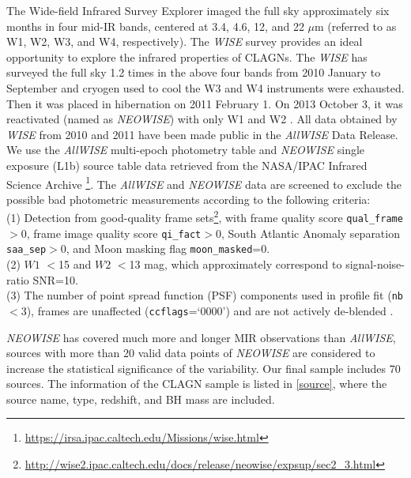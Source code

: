 \documentclass[linenumbers]{aastex631}
\begin{document}
The Wide-field Infrared Survey Explorer \citep[\textit{WISE};][]{2010AJ....140.1868W} imaged the full sky approximately six months in four mid-IR bands, centered at 3.4, 4.6, 12, and 22 $\mu$m (referred to as W1, W2, W3, and W4, respectively). The {\it WISE} survey provides an ideal opportunity to explore the infrared properties of CLAGNs. The {\it WISE} has surveyed the full sky {\color{red}1.2 times} in the above four bands from 2010 January to September and cryogen used to cool the W3 and W4 instruments were exhausted. Then it was placed in hibernation on 2011 February 1. On 2013 October 3, it was reactivated (named as \textit{NEOWISE}) with only W1 and W2 \citep{2014ApJ...792...30M}. All data obtained by {\it WISE} from 2010 and 2011 have been made public in the \textit{AllWISE} Data Release. We use the \textit{AllWISE} multi-epoch photometry table and \textit{NEOWISE} single exposure (L1b) source table data retrieved from the NASA/IPAC Infrared Science Archive \footnote{\url{https://irsa.ipac.caltech.edu/Missions/wise.html}}. The \textit{AllWISE} and \textit{NEOWISE} data are screened to exclude the possible bad photometric measurements according to the following criteria:\\
(1) Detection from good-quality frame sets\footnote{\url{http://wise2.ipac.caltech.edu/docs/release/neowise/expsup/sec2_3.html}}, with {frame quality score \texttt{qual\_frame}}$>$0, frame image quality score {\texttt{qi\_fact}}$>$0,
South Atlantic Anomaly separation {\texttt{saa\_sep}}$>0$, and Moon masking
flag {\texttt{moon\_masked}}=0.\\ 
(2) $W1$ $<$15 and $W2$ $<$13 mag, which approximately correspond to signal-noise-ratio SNR=10.\\
(3) The number of point spread function (PSF) components used in profile fit (\texttt{nb}$<$3), frames are unaffected (\texttt{cc\textunderscore flags}=`0000') and are not actively de-blended \citep[na$=$0; see also][]{2019MNRAS.483.2362R}.

\textit{NEOWISE} has covered much more and longer MIR observations than \textit{AllWISE}, sources with more than 20 valid data points of \textit{NEOWISE} are considered to increase the statistical significance of the variability. Our final sample includes 70 sources. The information of the CLAGN sample is listed in \autoref{source}, where the source name, type, redshift, and BH mass are included. 


\end{document}
